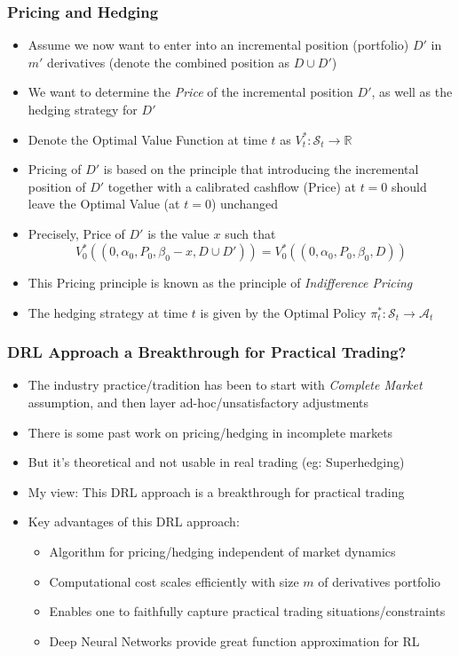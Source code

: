 \documentclass{beamer}
\begin{document}
\begin{frame}
\frametitle{Pricing and Hedging}
\begin{itemize}
\item Assume we now want to enter into an incremental position (portfolio) $D'$ in $m'$ derivatives (denote the combined position as $D \cup D'$)
\item We want to determine the {\em Price} of the incremental position $D'$, as well as the hedging strategy for $D'$
\item Denote the Optimal Value Function at time $t$ as $V_t^* : \mathcal{S}_t \rightarrow \mathbb{R}$
\item Pricing of $D'$ is based on the principle that introducing the incremental position of $D'$ together with a calibrated cashflow (Price) at $t=0$ should leave the Optimal Value (at $t=0$) unchanged
\item Precisely, Price of $D'$ is the value $x$ such that
$$V_0^*((0,\alpha_0,P_0,\beta_0-x,D\cup D')) = V_0^*((0, \alpha_0, P_0, \beta_0, D))$$
\item This Pricing principle is known as the principle of {\em Indifference Pricing}
\item The hedging strategy at time $t$ is given by the Optimal Policy $\pi_t^* : \mathcal{S}_t \rightarrow \mathcal{A}_t$
\end{itemize}
\end{frame}

\begin{frame}
\frametitle{DRL Approach a Breakthrough for Practical Trading?}
\begin{itemize}
\item The industry practice/tradition has been to start with {\em Complete Market} assumption, and then layer ad-hoc/unsatisfactory adjustments
\item There is some past work on pricing/hedging in incomplete markets
\item But it's theoretical and not usable in real trading (eg: Superhedging)
\item My view: This DRL approach is a breakthrough for practical trading
\item Key advantages of this DRL approach:
\begin{itemize}
\item Algorithm for pricing/hedging independent of market dynamics
\item Computational cost scales efficiently with size $m$ of derivatives portfolio
\item Enables one to faithfully capture practical trading situations/constraints
\item Deep Neural Networks provide great function approximation for RL 
\end{itemize}
\end{itemize}

\end{frame}
\end{document}
